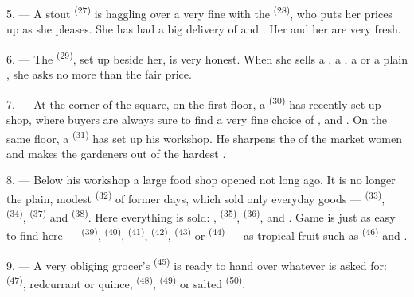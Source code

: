 5. --- A stout  \textsuperscript{(27)} is haggling over a very fine
 with the  \textsuperscript{(28)}, who puts her prices up
as she pleases. She has had a big delivery of  and
. Her  and her  are very fresh.

\VUsaut{4.0mm}
\VUsaut{3.0mm}

6. --- The  \textsuperscript{(29)}, set up beside her, is very honest.
When she sells a , a , a  or a plain
, she asks no more than the fair price.

7. --- At the corner of the square, on the first floor, a
 \textsuperscript{(30)} has recently set up shop, where buyers are
always sure to find a very fine choice of ,
 and . On the same floor, a
 \textsuperscript{(31)} has set up his workshop. He sharpens the
 of the market women and makes the gardeners
 out of the hardest .

\VUsaut{4.0mm}
\VUsaut{3.0mm}

8. --- Below his workshop a large food shop opened not long ago. It is no longer the plain,
modest  \textsuperscript{(32)} of former days, which sold only everyday
goods ---  \textsuperscript{(33)},
 \textsuperscript{(34)},  \textsuperscript{(37)} and
 \textsuperscript{(38)}. Here everything is sold:
,  \textsuperscript{(35)}, 
\textsuperscript{(36)},  and . Game is
just as easy to find here ---  \textsuperscript{(39)},
 \textsuperscript{(40)},  \textsuperscript{(41)},
 \textsuperscript{(42)},  \textsuperscript{(43)} or
 \textsuperscript{(44)} --- as tropical fruit such as 
\textsuperscript{(46)} and .

9. --- A very obliging grocer's  \textsuperscript{(45)} is ready to hand
over whatever is asked for:  \textsuperscript{(47)}, redcurrant or quince,
 \textsuperscript{(48)},  \textsuperscript{(49)} or salted
 \textsuperscript{(50)}.


